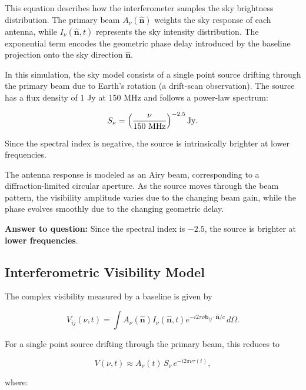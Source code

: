 \documentclass{article}
\begin{document}
This equation describes how the interferometer samples the sky brightness distribution. The primary beam $A_\nu(\hat{\mathbf{n}})$ weights the sky response of each antenna, while $I_\nu(\hat{\mathbf{n}},t)$ represents the sky intensity distribution. The exponential term encodes the geometric phase delay introduced by the baseline projection onto the sky direction $\hat{\mathbf{n}}$.

In this simulation, the sky model consists of a single point source drifting through the primary beam due to Earth’s rotation (a drift-scan observation). The source has a flux density of 1 Jy at 150 MHz and follows a power-law spectrum:

\begin{equation}
S_\nu =
\left(
\frac{\nu}{150\ {\rm MHz}}
\right)^{-2.5}
{\rm Jy}.
\end{equation}

Since the spectral index is negative, the source is intrinsically brighter at lower frequencies.

The antenna response is modeled as an Airy beam, corresponding to a diffraction-limited circular aperture. As the source moves through the beam pattern, the visibility amplitude varies due to the changing beam gain, while the phase evolves smoothly due to the changing geometric delay.

\textbf{Answer to question:}  
Since the spectral index is $-2.5$, the source is brighter at \textbf{lower frequencies}.
\FloatBarrier



\subsection{Interferometric Visibility Model}

The complex visibility measured by a baseline is given by

\begin{equation}
V_{ij}(\nu,t) =
\int
A_\nu(\hat{\mathbf{n}})
I_\nu(\hat{\mathbf{n}},t)
e^{-i2\pi\nu \mathbf{b}_{ij}\cdot \hat{\mathbf{n}}/c}
\, d\Omega.
\end{equation}

For a single point source drifting through the primary beam, this reduces to

\begin{equation}
V(\nu,t) \approx A_\nu(t)\, S_\nu \, e^{-i2\pi\nu \tau(t)},
\end{equation}

where:
\end{document}
